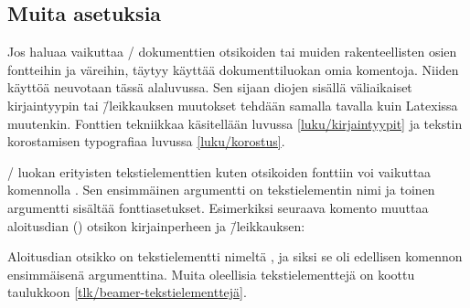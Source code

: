 \subsection{Muita asetuksia}
\label{luku/beamer-asetuksia}

Jos haluaa vaikuttaa \-/ dokumenttien otsikoiden tai
muiden rakenteellisten osien fontteihin ja väreihin, täytyy käyttää
dokumenttiluokan omia komentoja. Niiden käyttöä neuvotaan tässä
alaluvussa. Sen sijaan diojen sisällä väliaikaiset kirjaintyypin tai
\=/leikkauksen muutokset tehdään samalla tavalla kuin Latexissa
muutenkin. Fonttien tekniikkaa käsitellään luvussa
\ref{luku/kirjaintyypit} ja tekstin korostamisen typografiaa luvussa
\ref{luku/korostus}.

\-/ luokan erityisten tekstielementtien kuten otsikoiden
fonttiin voi vaikuttaa komennolla . Sen
ensimmäinen argumentti on tekstielementin nimi ja toinen argumentti
sisältää fonttiasetukset. Esimerkiksi seuraava komento muuttaa
aloitusdian () otsikon kirjainperheen ja
\=/leikkauksen:

\begin{koodilohkosis}
\end{koodilohkosis}


\noindent
Aloitusdian otsikko on tekstielementti nimeltä , ja siksi
se oli edellisen komennon ensimmäisenä argumenttina. Muita oleellisia
tekstielementtejä on koottu taulukkoon
\ref{tlk/beamer-tekstielementtejä}.

